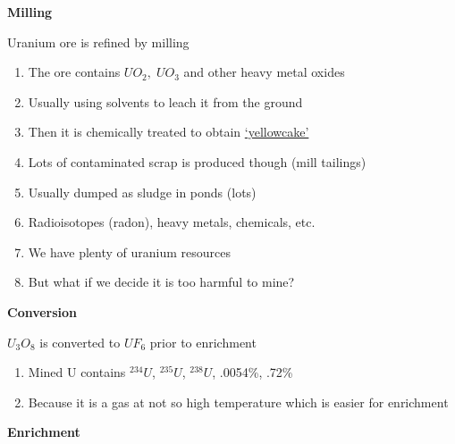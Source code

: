 \documentclass[aspectratio=1610,pdftex,dvipsnames,compress,xcolor={dvipsnames}]{beamer}
\begin{document}
\begin{frame}[plain]{}
    \centering\LARGE\textbf{Milling}
\end{frame}


\addtocounter{framenumber}{-1} 
\begin{frame}{Uranium ore is refined by milling}
    \begin{enumerate}[series=outerlist,topsep=0pt,itemsep=18pt,leftmargin=*,label=(\arabic*)]
        \item[]The ore contains $UO_2, \; UO_3$ and other heavy metal oxides
        \item[]Usually using solvents to leach it from the ground
        \item[]Then it is chemically treated to obtain \href{http://ibankcoin.com/zeropointnow/files/2017/11/c5fbed2f-575a-41bb-886e-f26700d43255-2060x1236-2.jpeg}{`yellowcake'}
        \item[]Lots of contaminated scrap is produced though (mill tailings)
        \item[]Usually dumped as sludge in ponds (lots)
        \item[]Radioisotopes (radon), heavy metals, chemicals, etc.
        \item[]We have plenty of uranium resources
        \item[]But what if we decide it is too harmful to mine?
    \end{enumerate}
\end{frame}


\begin{frame}[plain]{}
    \centering\LARGE\textbf{Conversion}
\end{frame}


\addtocounter{framenumber}{-1} 
\begin{frame}{$U_3O_8$ is converted to $UF_6$ prior to enrichment}
    \begin{enumerate}[series=outerlist,topsep=0pt,itemsep=21pt,leftmargin=*,label=(\arabic*)]
        \item[]Mined U contains $^{234}U$, $^{235}U$, $^{238}U$, .0054\%, .72\%
        \item[]Because it is a gas at not so high temperature which is easier for enrichment
    \end{enumerate}
\end{frame}


\begin{frame}[plain]{}
    \centering\LARGE\textbf{Enrichment}
\end{frame}
\end{document}
